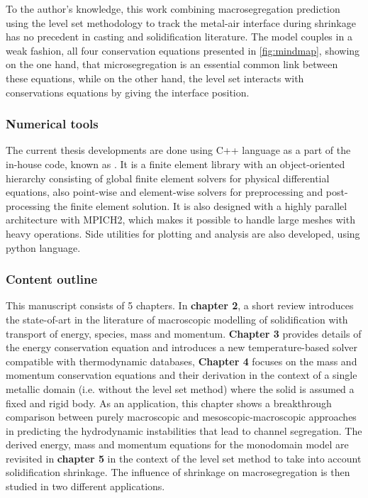 To the author's knowledge, this work 
combining macrosegregation prediction using the level set methodology to track the metal-air interface during 
shrinkage has no precedent in casting and solidification literature. The model couples in a weak fashion, all four
conservation equations presented in \cref{fig:mindmap}, showing on the one hand, that microsegregation is an essential 
common link between these equations, while on the other hand, the level set interacts with conservations equations by
giving the interface position. 
%
\subsubsection{Numerical tools}
The current thesis developments are done using C++ language as a part of the
in-house code, known as \cimlib \citep{digonnet_cimlib:_2007,mesri_advanced_2009}. It is a finite element library with an object-oriented hierarchy
consisting of global finite element solvers for physical differential equations, also point-wise and element-wise solvers for 
preprocessing and post-processing the finite element solution. It is also designed with a highly parallel architecture with MPICH2, which makes it possible
to handle large meshes with heavy operations. Side utilities for plotting and analysis
are also developed, using python language.

\subsubsection{Content outline}
This manuscript consists of 5 chapters. In \textbf{chapter 2}, a short review introduces the state-of-art in the literature of 
macroscopic modelling of solidification with transport of energy, species, mass and momentum. \textbf{Chapter 3} provides details
of the energy conservation equation and introduces a new temperature-based solver compatible with thermodynamic databases,
\textbf{Chapter 4} focuses on the mass and momentum conservation equations 
and their derivation in the context of a single metallic domain (i.e. without 
the level set method) where the solid is assumed a fixed and rigid body. As an 
application, this chapter shows a breakthrough comparison between purely macroscopic 
and mesoscopic-macroscopic approaches in predicting the hydrodynamic instabilities 
that lead to channel segregation.
The derived energy, mass and momentum equations for the monodomain model are revisited 
in \textbf{chapter 5} in the context of the level set method to take into account solidification shrinkage.
The influence of shrinkage on macrosegregation is then studied in two different applications.

